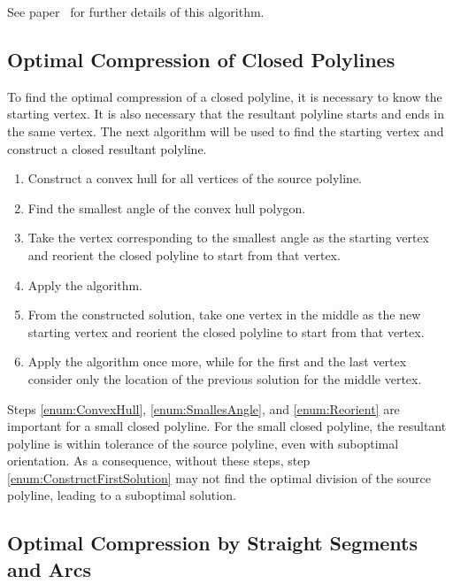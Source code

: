 \documentclass[conference]{IEEEtran}
\begin{document}
See paper~\cite{PolylineGeneralizationCombinatorical} for further details of this algorithm.

\subsection{Optimal Compression of Closed Polylines}

To find the optimal compression of a closed polyline, it is necessary to know the starting vertex. It is also necessary that the resultant polyline starts and ends in the same vertex. The next algorithm will be used to find the starting vertex and construct a closed resultant polyline.
\begin{enumerate}[label={\arabic*.}, ref={\arabic*}]
  \item \label{enum:ConvexHull} Construct a convex hull for all vertices of the source polyline.
  \item \label{enum:SmallesAngle}  Find the smallest angle of the convex hull polygon.
  \item \label{enum:Reorient}  Take the vertex corresponding to the smallest angle as the starting vertex and reorient the closed polyline to start from that vertex.
  \item Apply the algorithm.
  \item \label{enum:ConstructFirstSolution} From the constructed solution, take one vertex in the middle as the new starting vertex and reorient the closed polyline to start from that vertex.
  \item Apply the algorithm once more, while for the first and the last vertex consider only the location of the previous solution for the middle vertex.
\end{enumerate}

Steps \ref{enum:ConvexHull}, \ref{enum:SmallesAngle}, and \ref{enum:Reorient} are important for a small closed polyline. For the small closed polyline, the resultant polyline is within tolerance of the source polyline, even with suboptimal orientation. As a consequence, without these steps, step \ref{enum:ConstructFirstSolution} may not find the optimal division of the source polyline, leading to a suboptimal solution.

\subsection{Optimal Compression by Straight Segments and Arcs}
\end{document}
